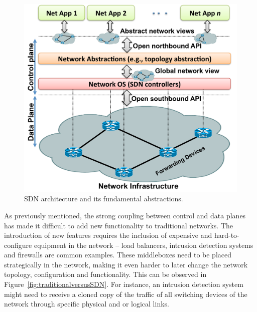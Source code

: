 \begin{figure}[t!]
\centering
\includegraphics[width=0.95\columnwidth]{figures/fig3_sdn_abstractions.pdf}
\caption{SDN architecture and its fundamental abstractions.}
\label{fig:sdn_abstractions}
\end{figure}

As previously mentioned, the strong coupling between control and data planes has made it difficult 
to add new functionality to traditional networks. The introduction of new features requires the 
inclusion of expensive and hard-to-configure equipment in the network -- load balancers, intrusion detection systems and firewalls 
are common examples. These middleboxes need to be placed strategically in the network, making it 
even harder to later change the network topology, configuration and functionality. 
This can be observed in Figure~\ref{fig:traditionalversusSDN}.
For instance, an intrusion detection system might need to receive a cloned copy of the traffic of all switching devices of the network through specific physical and or logical links.

